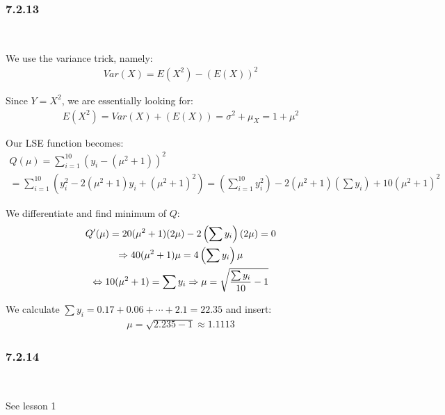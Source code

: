 \subsubsection{7.2.13}\hfill\\\par
\noindent We use the variance trick, namely:
\begin{equation*}
  \begin{gathered}
    Var(X) = E(X^2)-(E(X))^2
  \end{gathered}
\end{equation*}\par
\noindent Since $Y = X^2$, we are essentially looking for:
\begin{equation*}
  \begin{gathered}
    E(X^2) = Var(X) + (E(X)) = \sigma^2 + \mu_X = 1+\mu^2
  \end{gathered}
\end{equation*}\par
\noindent Our LSE function becomes: 
\begin{equation*}
  \begin{gathered}
    Q(\mu) = \sum_{i=1}^{10}(y_i-(\mu^2+1))^2\\
    = \sum_{i=1}^{10}\left(y_i^2-2(\mu^2+1)y_i+(\mu^2+1)^2\right) = \left(\sum_{i=1}^{10}y_i^2\right)-2(\mu^2+1)\left(\sum y_i\right) + 10(\mu^2+1)^2
  \end{gathered}
\end{equation*}\par
\noindent We differentiate and find minimum of $Q$:
\begin{equation*}
  \begin{gathered}
    Q^{\prime}(\mu) = 20(\mu^2+1)(2\mu)-2\left(\sum y_i\right)(2\mu) = 0\\
    \Rightarrow 40(\mu^2+1)\mu = 4\left(\sum y_i\right)\mu\\
    \Leftrightarrow 10(\mu^2+1) =\sum y_i \Rightarrow \mu = \sqrt{\dfrac{\sum y_i}{10}-1}
  \end{gathered}
\end{equation*}\par
\noindent We calculate $\sum y_i = 0.17+0.06+\cdots+2.1 = 22.35$ and insert:
\begin{equation*}
  \begin{gathered}
    \mu = \sqrt{2.235-1}\approx 1.1113
  \end{gathered}
\end{equation*}
\par\bigskip
\subsubsection{7.2.14}\hfill\\\par
\noindent See lesson 1
\par\bigskip
